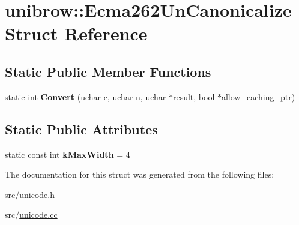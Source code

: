 \hypertarget{structunibrow_1_1_ecma262_un_canonicalize}{}\section{unibrow\+:\+:Ecma262\+Un\+Canonicalize Struct Reference}
\label{structunibrow_1_1_ecma262_un_canonicalize}
\subsection*{Static Public Member Functions}
\begin{DoxyCompactItemize}
\item 
\hypertarget{structunibrow_1_1_ecma262_un_canonicalize_a1740c097b65e6f7d1f191460d140b8b0}{}static int {\bfseries Convert} (uchar c, uchar n, uchar $\ast$result, bool $\ast$allow\+\_\+caching\+\_\+ptr)\label{structunibrow_1_1_ecma262_un_canonicalize_a1740c097b65e6f7d1f191460d140b8b0}

\end{DoxyCompactItemize}
\subsection*{Static Public Attributes}
\begin{DoxyCompactItemize}
\item 
\hypertarget{structunibrow_1_1_ecma262_un_canonicalize_a3c53472528136e8a9e0d10ac29ee2456}{}static const int {\bfseries k\+Max\+Width} = 4\label{structunibrow_1_1_ecma262_un_canonicalize_a3c53472528136e8a9e0d10ac29ee2456}

\end{DoxyCompactItemize}


The documentation for this struct was generated from the following files\+:\begin{DoxyCompactItemize}
\item 
src/\hyperlink{unicode_8h}{unicode.\+h}\item 
src/\hyperlink{unicode_8cc}{unicode.\+cc}\end{DoxyCompactItemize}
